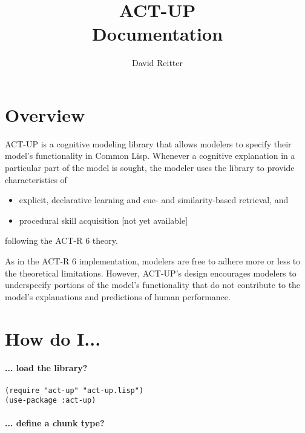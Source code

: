 \documentclass{article}
\begin{document}
\title{ACT-UP \\
Documentation}

\author{David Reitter}

\maketitle




\section{Overview}


ACT-UP is a cognitive modeling library that allows modelers to specify their model's functionality in Common Lisp.  Whenever a cognitive explanation in a particular part of the model is sought, the modeler uses the library to provide characteristics of 

\begin{itemize}\item  explicit, declarative learning and cue- and similarity-based
  retrieval, and \item procedural skill acquisition [not yet available]
\end{itemize}
following the ACT-R 6 theory.

As in the ACT-R 6 implementation, modelers are free to adhere more or less to the theoretical limitations.  However, ACT-UP's design encourages modelers to underspecify portions of the model's functionality that do not contribute to the model's explanations and predictions of human performance.  




\section{How do I...}

\paragraph {... load the library?}

\begin{verbatim}
(require "act-up" "act-up.lisp")
(use-package :act-up)
\end{verbatim}


\paragraph {... define a chunk type?}
\end{document}
